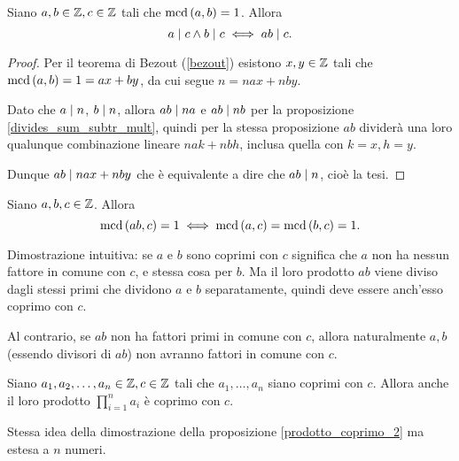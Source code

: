 \begin{proposition} \label{prodotto_numeri_coprimi}
    Siano $a, b \in \mathbb{Z}, c \in \mathbb{Z}$ tali che $\operatorname{mcd}\left(a, b\right) = 1$. Allora
    \begin{equation}
        a \mid c \land b \mid c \iff ab \mid c.
    \end{equation}
\end{proposition}
\begin{proof}
    Per il teorema di Bezout (\ref{bezout}) esistono $x, y \in \mathbb{Z}$ tali che $\operatorname{mcd}\left(a, b\right) = 1 = ax+by$, da cui segue $n = nax + nby$.

    Dato che $a \mid n$, $b \mid n$, allora $ab \mid na$ e $ab \mid nb$ per la proposizione \ref{divides_sum_subtr_mult}, quindi per la stessa proposizione $ab$ dividerà una loro qualunque combinazione lineare $nak + nbh$, inclusa quella con $k = x, h = y$.

    Dunque $ab \mid nax + nby$ che è equivalente a dire che $ab \mid n$, cioè la tesi.
\end{proof}


\begin{proposition} \label{prodotto_coprimo_2}
    Siano $a, b, c \in \mathbb{Z}$. Allora
    \begin{equation}
        \operatorname{mcd}\left(ab, c\right) = 1 \iff \operatorname{mcd}\left(a, c\right) = \operatorname{mcd}\left(b, c\right) = 1.
    \end{equation}
\end{proposition}
\begin{intuition}
    Dimostrazione intuitiva: se $a$ e $b$ sono coprimi con $c$ significa che $a$ non ha nessun fattore in comune con $c$, e stessa cosa per $b$. Ma il loro prodotto $ab$ viene diviso dagli stessi primi che dividono $a$ e $b$ separatamente, quindi deve essere anch'esso coprimo con $c$.

    Al contrario, se $ab$ non ha fattori primi in comune con $c$, allora naturalmente $a, b$ (essendo divisori di $ab$) non avranno fattori in comune con $c$.
\end{intuition}

\begin{corollary} \label{prodotto_coprimo_n}
    Siano $a_1, a_2, \dots, a_n \in \mathbb{Z}, c \in \mathbb{Z}$ tali che $a_1, \dots, a_n$ siano coprimi con $c$. Allora anche il loro prodotto $\prod_{i = 1}^{n} a_i$ è coprimo con $c$.
\end{corollary}
\begin{intuition}
    Stessa idea della dimostrazione della proposizione \ref{prodotto_coprimo_2} ma estesa a $n$ numeri.
\end{intuition}

